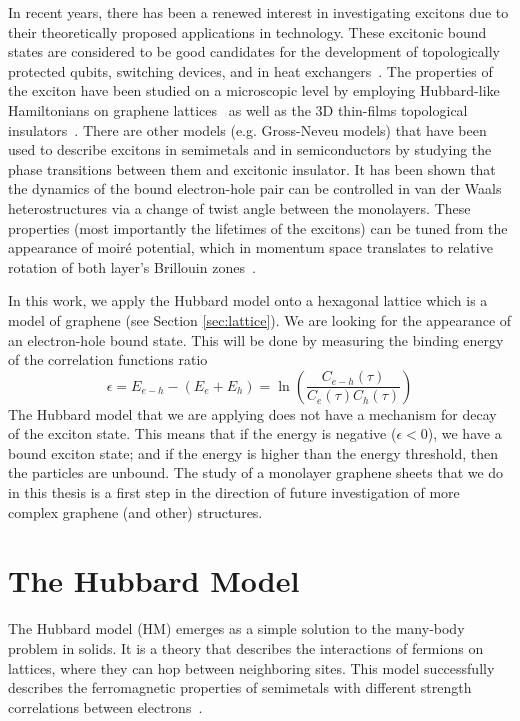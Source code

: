 In recent years, there has been a renewed interest in investigating excitons due to their theoretically proposed applications in technology. These excitonic bound states are considered to be good candidates for the development of topologically protected qubits, switching devices, and in heat exchangers~\cite{graphapl1, graphapl2, graphapl3}. The properties of the exciton have been studied on a microscopic level by employing Hubbard-like Hamiltonians on graphene lattices~\cite{graphene1, graphene2} as well as the 3D thin-films topological insulators~\cite{graphene3, graphene4, graphene5}. There are other models (e.g. Gross-Neveu models) that have been used to describe excitons in semimetals and in semiconductors by studying the phase transitions between them and excitonic insulator. It has been shown that the dynamics of the bound electron-hole pair can be controlled in van der Waals heterostructures via a change of twist angle between the monolayers. These properties (most importantly the lifetimes of the excitons) can be tuned from the appearance of moiré potential, which in momentum space translates to relative rotation of both layer's Brillouin zones~\cite{twistangle}.

In this work, we apply the Hubbard model onto a hexagonal lattice which is a model of graphene (see Section \ref{sec:lattice}). We are looking for the appearance of an electron-hole bound state. This will be done by measuring the binding energy of the correlation functions ratio
\begin{equation}
    \epsilon = E_{e-h} - (E_e + E_h)= \ln\left( \frac{C_{e-h}(\tau)}{C_e(\tau)C_h(\tau)} \right)
\end{equation}
The Hubbard model that we are applying does not have a mechanism for decay of the exciton state. This means that if the energy is negative ($\epsilon < 0$), we have a bound exciton state; and if the energy is higher than the energy threshold, then the particles are unbound. The study of a monolayer graphene sheets that we do in this thesis is a first step in the direction of future investigation of more complex graphene (and other) structures.

\section{The Hubbard Model}

The Hubbard model (HM) emerges as a simple solution to the many-body problem in solids. It is a theory that describes the interactions of fermions on lattices, where they can hop between neighboring sites. This model successfully describes the ferromagnetic properties of semimetals with different strength correlations between electrons~\cite{hubex1, hubex2}. %

